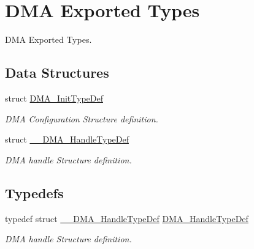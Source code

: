 \hypertarget{group___d_m_a___exported___types}{}\section{D\+MA Exported Types}
\label{group___d_m_a___exported___types}


D\+MA Exported Types.  


\subsection*{Data Structures}
\begin{DoxyCompactItemize}
\item 
struct \mbox{\hyperlink{struct_d_m_a___init_type_def}{D\+M\+A\+\_\+\+Init\+Type\+Def}}
\begin{DoxyCompactList}\small\item\em D\+MA Configuration Structure definition. \end{DoxyCompactList}\item 
struct \mbox{\hyperlink{struct_____d_m_a___handle_type_def}{\+\_\+\+\_\+\+D\+M\+A\+\_\+\+Handle\+Type\+Def}}
\begin{DoxyCompactList}\small\item\em D\+MA handle Structure definition. \end{DoxyCompactList}\end{DoxyCompactItemize}
\subsection*{Typedefs}
\begin{DoxyCompactItemize}
\item 
\mbox{\label{group___d_m_a___exported___types_ga41b754a906b86bce54dc79938970138b}} 
typedef struct \mbox{\hyperlink{struct_____d_m_a___handle_type_def}{\+\_\+\+\_\+\+D\+M\+A\+\_\+\+Handle\+Type\+Def}} \mbox{\hyperlink{group___d_m_a___exported___types_ga41b754a906b86bce54dc79938970138b}{D\+M\+A\+\_\+\+Handle\+Type\+Def}}
\begin{DoxyCompactList}\small\item\em D\+MA handle Structure definition. \end{DoxyCompactList}\end{DoxyCompactItemize}
